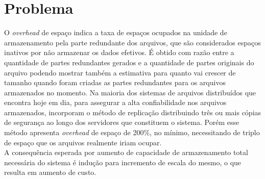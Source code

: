 
	\section{Problema}
	O \textit{overhead} de espaço indica a taxa de espaços ocupados na unidade de armazenamento pela parte redundante dos arquivos, que são considerados espaços inativos por não armazenar os dados efetivos.
	É obtido com razão entre a quantidade de partes redundantes gerados e a quantidade de partes originais do arquivo 
	podendo mostrar também a estimativa para quanto vai crescer de tamanho quando foram criadas as partes redundantes para os arquivos armazenados no momento.
	Na maioria dos sistemas de arquivos distribuídos que encontra hoje em dia, para assegurar a alta confiabilidade nos arquivos armazenados, incorporam o método de replicação distribuindo três ou mais cópias de segurança ao longo dos servidores que constituem o sistema. Porém esse método apresenta \textit{overhead} de espaço de 200\%, no mínimo, necessitando de triplo de espaço que os arquivos realmente iriam ocupar.\\
	
	A consequência esperada por aumento de capacidade de armazenamento total necessária do sistema é indução para incremento de escala do mesmo, o que resulta em aumento de custo.  
	

	
	
	

	
	
	
	

 

	

